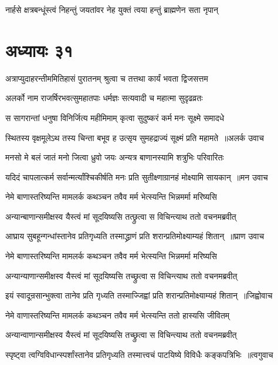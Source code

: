 \twolineshloka
{नार्हसे क्षत्रबन्धूंस्त्वं निहन्तुं जयतांवर}
{नेह युक्तं त्वया हन्तुं ब्राह्मणेन सता नृपान्}


\chapter{अध्यायः ३१}
\twolineshloka
{अत्राप्युदाहरन्तीममितिहासं पुरातनम्}
{श्रुत्वा च तत्तथा कार्यं भवता द्विजसत्तम}


\twolineshloka
{अलर्को नाम राजर्षिरभवत्सुमहातपाः}
{धर्मज्ञः सत्यवादी च महात्मा सुदृढव्रतः}


\twolineshloka
{स सागरान्तां धनुषा विनिर्जित्य महीमिमाम्}
{कृत्वा सुदुष्करं कर्म मनः सूक्ष्मे समादधे}


\threelineshloka
{स्थितस्य वृक्षमूलेऽथ तस्य चिन्ता बभूव ह}
{उत्सृय सुमहद्राज्यं सूक्ष्मं प्रति महामते ॥अलर्क उवाच}
{}


\twolineshloka
{मनसो मे बलं जातं मनो जित्वा ध्रुवो जयः}
{अन्यत्र बाणानस्यामि शत्रुभिः परिवारितः}


\threelineshloka
{यदिदं चापलात्कर्म सर्वान्मर्त्यांश्चिकीर्षति}
{मनः प्रति सुतीक्ष्णाग्रानहं मोक्ष्यामि सायकान् ॥मन उवाच}
{}


\twolineshloka
{नेमे बाणास्तरिष्यन्ति मामलर्क कथञ्चन}
{तवैव मर्म भेत्स्यन्ति भिन्नमर्मा मरिष्यसि}


\twolineshloka
{अन्यान्बाणान्समीक्षस्व यैस्त्वं मां सूदयिष्यसि}
{तत्छ्रुत्वा स विचिन्त्याथ ततो वचनमब्रवीत्}


\threelineshloka
{आघ्राय सुबहून्गन्धांस्तानेव प्रतिगृध्यति}
{तस्माद्ध्राणं प्रति शरान्प्रतिमोक्ष्याम्यहं शितान् ॥घ्राण उवाच}
{}


\twolineshloka
{नेमे बाणास्तरिष्यन्ति मामलर्क कथञ्चन}
{तवैव मर्म भेत्स्यन्ति भिन्नमर्मा मरिष्यसि}


\twolineshloka
{अन्यान्याणान्समीक्षस्व यैस्त्वं मां सूदयिष्यसि}
{तच्छ्रुत्वा स विचिन्त्याथ ततो वचनमब्रवीत्}


\threelineshloka
{इयं स्वादून्रसान्भुक्त्वा तानेव प्रति गृध्यति}
{तस्माज्जिह्वां प्रति शरान्प्रतिमोक्ष्याम्यहं शितान् ॥जिह्वोवाच}
{}


\twolineshloka
{नेमे वाणास्तरिष्यन्ति मामलर्क कथञ्चन}
{तवैव मर्म भेत्स्यन्ति ततो हास्यसि जीवितम्}


\twolineshloka
{अन्यान्वाणान्समीक्षस्व यैस्त्वं मां सूदयिष्यसि}
{तच्छ्रुत्वा स विचिन्त्याथ ततो वचनमब्रवीत्}


\threelineshloka
{स्पृष्ट्वा त्वग्विविधान्स्पर्शांस्तानेव प्रतिगृध्यति}
{तस्मात्त्वचं पाटयिष्ये विविधैः कङ्कपत्रिभिः ॥त्वगुवाच}
{}


